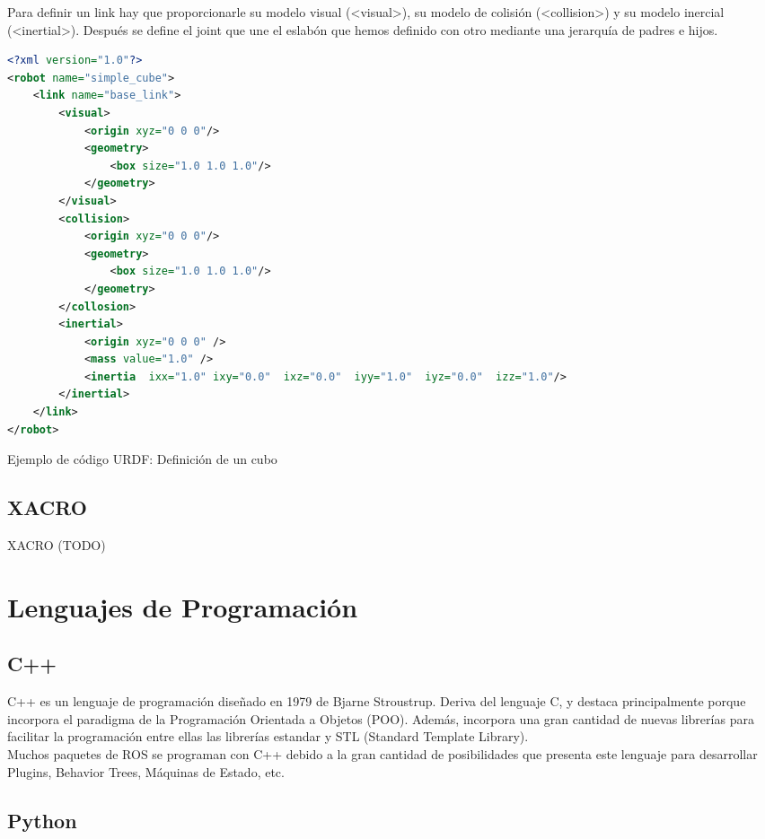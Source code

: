 Para definir un link hay que proporcionarle su modelo visual (<visual>), su modelo de colisión (<collision>) y su modelo inercial (<inertial>). Después se define el joint que une el eslabón que hemos definido con otro mediante una jerarquía de padres e hijos.\\

\begin{code}[h]
\begin{lstlisting}[language=XML]
<?xml version="1.0"?>
<robot name="simple_cube">
	<link name="base_link">
		<visual>
			<origin xyz="0 0 0"/>
			<geometry>
				<box size="1.0 1.0 1.0"/>
			</geometry>
		</visual>
		<collision>
			<origin xyz="0 0 0"/>
			<geometry>
				<box size="1.0 1.0 1.0"/>
			</geometry>
		</collosion>
		<inertial>
			<origin xyz="0 0 0" /> 
			<mass value="1.0" />
			<inertia  ixx="1.0" ixy="0.0"  ixz="0.0"  iyy="1.0"  iyz="0.0"  izz="1.0"/>
		</inertial>
	</link>
</robot>
\end{lstlisting}
\caption[Ejemplo de código URDF: Definición de un cubo]{Ejemplo de código URDF: Definición de un cubo}
\label{cod:codigo_urdf}
\end{code}

\subsection{XACRO}
\label{sec:xacro}

XACRO (TODO)

\section{Lenguajes de Programación}
\subsection{C++}
\label{sec:c++}

C++ es un lenguaje de programación diseñado en 1979 de Bjarne Stroustrup. Deriva del lenguaje C, y destaca principalmente porque incorpora el paradigma de la Programación Orientada a Objetos (POO). Además, incorpora una gran cantidad de nuevas librerías para facilitar la programación entre ellas las librerías estandar y STL (Standard Template Library).\\

Muchos paquetes de ROS se programan con C++ debido a la gran cantidad de posibilidades que presenta este lenguaje para desarrollar Plugins, Behavior Trees, Máquinas de Estado, etc.

\subsection{Python}
\label{sec:python}


